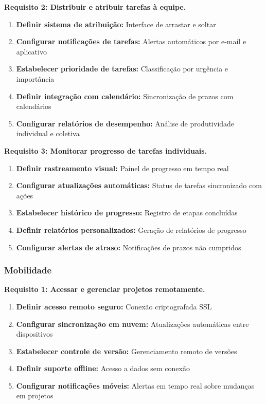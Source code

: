 \textbf{Requisito 2: Distribuir e atribuir tarefas à equipe.}
\begin{enumerate}[leftmargin=*]
    \item \textbf{Definir sistema de atribuição:} Interface de arrastar e soltar
    \item \textbf{Configurar notificações de tarefas:} Alertas automáticos por e-mail e aplicativo
    \item \textbf{Estabelecer prioridade de tarefas:} Classificação por urgência e importância
    \item \textbf{Definir integração com calendário:} Sincronização de prazos com calendários
    \item \textbf{Configurar relatórios de desempenho:} Análise de produtividade individual e coletiva
\end{enumerate}

\textbf{Requisito 3: Monitorar progresso de tarefas individuais.}
\begin{enumerate}[leftmargin=*]
    \item \textbf{Definir rastreamento visual:} Painel de progresso em tempo real
    \item \textbf{Configurar atualizações automáticas:} Status de tarefas sincronizado com ações
    \item \textbf{Estabelecer histórico de progresso:} Registro de etapas concluídas
    \item \textbf{Definir relatórios personalizados:} Geração de relatórios de progresso
    \item \textbf{Configurar alertas de atraso:} Notificações de prazos não cumpridos
\end{enumerate}

\subsubsection{Mobilidade}
\textbf{Requisito 1: Acessar e gerenciar projetos remotamente.}
\begin{enumerate}[leftmargin=*]
    \item \textbf{Definir acesso remoto seguro:} Conexão criptografada SSL
    \item \textbf{Configurar sincronização em nuvem:} Atualizações automáticas entre dispositivos
    \item \textbf{Estabelecer controle de versão:} Gerenciamento remoto de versões
    \item \textbf{Definir suporte offline:} Acesso a dados sem conexão
    \item \textbf{Configurar notificações móveis:} Alertas em tempo real sobre mudanças em projetos
\end{enumerate}

